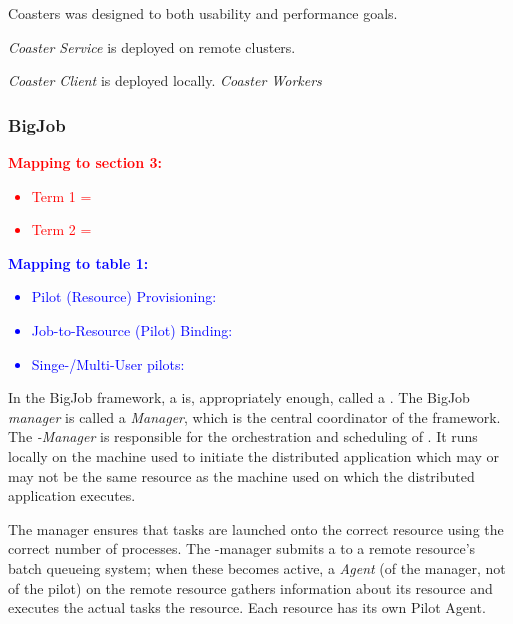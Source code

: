 \documentclass{sig-alternate}
\begin{document}
Coasters was designed to both usability and performance goals.


\textit{Coaster Service} is deployed on remote clusters.

\textit{Coaster Client} is deployed locally.
\textit{Coaster Workers}



%
\subsubsection{BigJob}


\textcolor{red}
{
\textbf{Mapping to section 3:}
\begin{itemize}
\item Term 1 =
\item Term 2 =
\end{itemize}
}

\textcolor{blue}
{
\textbf{Mapping to table 1:}
\begin{itemize}
\item Pilot (Resource) Provisioning:
\item Job-to-Resource (Pilot) Binding:
\item Singe-/Multi-User pilots:
\end{itemize}
}

In the BigJob framework, a \pilot is, appropriately enough, called a
\pilot. The BigJob \textit{manager} is called a \textit{\pilot
  Manager}, which is the central coordinator of the
framework.  The \textit{\pilot-Manager} is responsible for
the orchestration and scheduling of \pilots. It runs locally on the
machine used to initiate the distributed application which may or may
not be the same resource as the machine used on which the distributed
application executes.

The manager ensures that tasks are launched onto the correct resource
using the correct number of processes. The \pilot-manager submits a
\pilot to a remote resource's batch queueing system; when these
\pilots becomes active, a \textit{Agent} (of the manager, not of the
pilot) on the remote resource gathers information about its resource
and executes the actual tasks the resource.   Each resource has its own Pilot Agent. 
\end{document}
